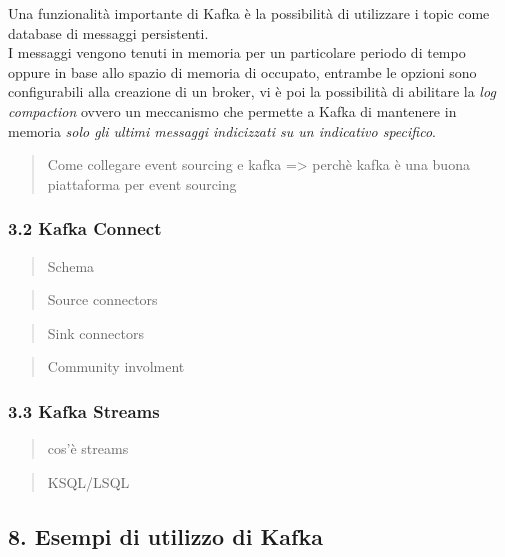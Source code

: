 \documentclass[]{article}
\begin{document}
\newpage

Una funzionalità importante di Kafka è la possibilità di utilizzare i
topic come database di messaggi persistenti.\\
I messaggi vengono tenuti in memoria per un particolare periodo di tempo
oppure in base allo spazio di memoria di occupato, entrambe le opzioni
sono configurabili alla creazione di un broker, vi è poi la possibilità
di abilitare la \emph{log compaction} ovvero un meccanismo che permette
a Kafka di mantenere in memoria \emph{solo gli ultimi messaggi
indicizzati su un indicativo specifico}.

\begin{quote}
Come collegare event sourcing e kafka =\textgreater{} perchè kafka è una
buona piattaforma per event sourcing
\end{quote}

\subsubsection{3.2 Kafka Connect}\label{kafka-connect}

\begin{quote}
Schema
\end{quote}

\begin{quote}
Source connectors
\end{quote}

\begin{quote}
Sink connectors
\end{quote}

\begin{quote}
Community involment
\end{quote}

\subsubsection{3.3 Kafka Streams}\label{kafka-streams}

\begin{quote}
cos'è streams
\end{quote}

\begin{quote}
KSQL/LSQL
\end{quote}

\subsection{8. Esempi di utilizzo di
Kafka}\label{esempi-di-utilizzo-di-kafka}
\end{document}

